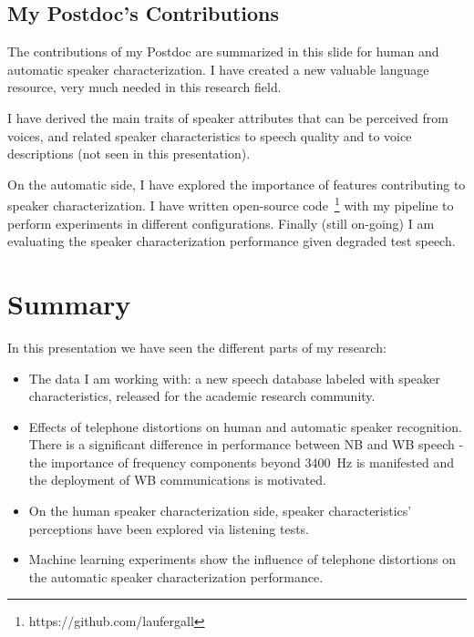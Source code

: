 \documentclass[a4paper]{article}
\begin{document}
\subsection{My Postdoc's Contributions}

The contributions of my Postdoc are summarized in this slide for human and automatic speaker characterization. I have created a new valuable language resource, very much needed in this research field. 

I have derived the main traits of speaker attributes that can be perceived from voices, and related speaker characteristics to speech quality and to voice descriptions (not seen in this presentation).

On the automatic side, I have explored the importance of features contributing to speaker characterization. I have written open-source code~\footnote{https://github.com/laufergall} with my pipeline to perform experiments in different configurations. Finally (still on-going) I am evaluating the speaker characterization performance given degraded test speech.


\section{Summary}

In this presentation we have seen the different parts of my research: 

\begin{itemize}
	\item The data I am working with: a new speech database labeled with speaker characteristics, released for the academic research community.
	\item Effects of telephone distortions on human and automatic speaker recognition. There is a significant difference in performance between NB and WB speech - the importance of frequency components beyond 3400~Hz is manifested and the deployment of WB communications is motivated.
	\item On the human speaker characterization side, speaker characteristics' perceptions have been explored via listening tests.
	\item Machine learning experiments show the influence of telephone distortions on the automatic speaker characterization performance.
	
\end{itemize}







\end{document}
